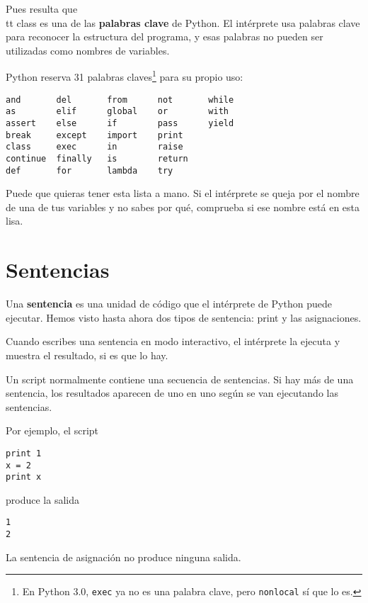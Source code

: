 Pues resulta que {\\tt class} es una de las {\bf palabras clave} de Python. El
intérprete usa palabras clave para reconocer la estructura del programa,
y esas palabras no pueden ser utilizadas como nombres de variables.


Python reserva 31 palabras claves\footnote{En Python 3.0, {\tt exec} ya no es
una palabra clave, pero {\tt nonlocal} sí que lo es.} para su propio uso:

\beforeverb
\begin{verbatim}
and       del       from      not       while    
as        elif      global    or        with     
assert    else      if        pass      yield    
break     except    import    print              
class     exec      in        raise              
continue  finally   is        return             
def       for       lambda    try
\end{verbatim}
\afterverb
%
Puede que quieras tener esta lista a mano. Si el intérprete se queja
por el nombre de una de tus variables y no sabes por qué, comprueba
si ese nombre está en esta lisa.

\section{Sentencias}

Una {\bf sentencia} es una unidad de código que el intérprete de Python puede
ejecutar. Hemos visto hasta ahora dos tipos de sentencia: print
y las asignaciones.


Cuando escribes una sentencia en modo interactivo, el intérprete la
ejecuta y muestra el resultado, si es que lo hay.

Un script normalmente contiene una secuencia de sentencias. Si hay
más de una sentencia, los resultados aparecen de uno en uno
según se van ejecutando las sentencias.

Por ejemplo, el script

\beforeverb
\begin{verbatim}
print 1
x = 2
print x
\end{verbatim}
\afterverb
%
produce la salida

\beforeverb
\begin{verbatim}
1
2
\end{verbatim}
\afterverb
%
La sentencia de asignación no produce ninguna salida.


